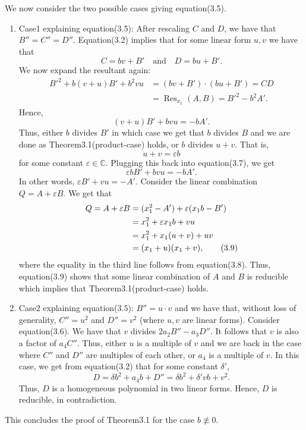We now consider the two possible cases giving equation(3.5).
\begin{enumerate}
\item Case1 explaining equation(3.5): After rescaling $C$ and $D$, we have that $B''=C''=D''$. Equation(3.2) implies that for some linear form $u,v$ we have that
\[C=bv+B'\quad\text{and}\quad D=bu+B'.\]
We now expand the resultant again:
\begin{align*}B'^2+b(v+u)B'+b^2vu&=(bv+B')\cdot(bu+B')=CD\\&=\operatorname{Res}_{x_1}(A,B)=B'^2-b^2A'.\end{align*}
Hence,
\begin{equation}(v+u)B'+bvu=-bA'.\tag{3.7}\end{equation}
Thus, either $b$ divides $B'$ in which case we get that $b$ divides $B$ and we are done as Theorem3.1(product-case) holds, or $b$ divides $u+v$. That is,
\begin{equation}u+v=\varepsilon b\tag{3.8}\end{equation}
for some constant $\varepsilon\in\mathbb C$. Plugging this back into equation(3.7), we get
\[\varepsilon bB'+bvu=-bA'.\]
In other words, $\varepsilon B'+vu=-A'$.
Consider the linear combination $Q=A+\varepsilon B$. We get that
\begin{align}Q=A+\varepsilon B&=(x_1^2-A')+\varepsilon(x_1b-B')\notag\\&=x_1^2+\varepsilon x_1b+vu\notag\\&=x_1^2+x_1(u+v)+uv\notag\\&=(x_1+u)(x_1+v),\tag{3.9}\end{align}
where the equality in the third line follows from equation(3.8). Thus, equation(3.9) shows that some linear combination of $A$ and $B$ is reducible which implies that Theorem3.1(product-case) holds.
\item Case2 explaining equation(3.5): $B''=u\cdot v$ and we have that, without loss of generality, $C''=u^2$ and $D''=v^2$ (where $u,v$ are linear forms). Consider equation(3.6). We have that $v$ divides $2a_2B''-a_3D''$. It follows that $v$ is also a factor of $a_4C''$. Thus, either $u$ is a multiple of $v$ and we are back in the case where $C''$ and $D''$ are multiples of each other, or $a_4$ is a multiple of $v$. In this case, we get from equation(3.2) that for some constant $\delta'$,
\[D=\delta b^2+a_4b+D''=\delta b^2+\delta'vb+v^2.\]
Thus, $D$ is a homogeneous polynomial in two linear forms. Hence, $D$ is reducible, in contradiction.
\end{enumerate}
This concludes the proof of Theorem3.1 for the case $b\not\equiv0$.
